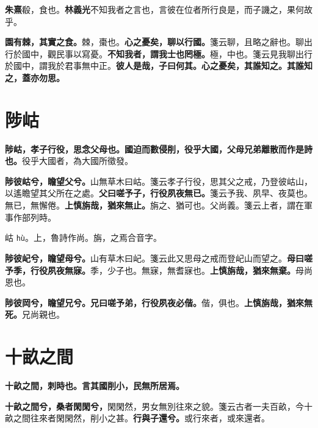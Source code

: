 \begin{quoting}\textbf{朱熹}殽，食也。\textbf{林義光}不知我者之言也，言彼在位者所行良是，而子譏之，果何故乎。\end{quoting}

\textbf{園有棘，其實之食。}{\footnotesize 棘，棗也。}\textbf{心之憂矣，聊以行國。}{\footnotesize 箋云聊，且略之辭也。聊出行於國中，觀民事以寫憂。}\textbf{不知我者，謂我士也罔極。}{\footnotesize 極，中也。箋云見我聊出行於國中，謂我於君事無中正。}\textbf{彼人是哉，子曰何其。心之憂矣，其誰知之。其誰知之，蓋亦勿思。}

\section{陟岵}


\textbf{陟岵，孝子行役，思念父母也。國迫而數侵削，役乎大國，父母兄弟離散而作是詩也。}{\footnotesize 役乎大國者，為大國所徵發。}

\textbf{陟彼岵兮，瞻望父兮。}{\footnotesize 山無草木曰岵。箋云孝子行役，思其父之戒，乃登彼岵山，以遙瞻望其父所在之處。}\textbf{父曰嗟予子，行役夙夜無已。}{\footnotesize 箋云予我、夙早、夜莫也。無已，無懈倦。}\textbf{上慎旃哉，猶來無止。}{\footnotesize 旃之、猶可也。父尚義。箋云上者，謂在軍事作部列時。}

\begin{quoting}岵 \texttt{hù}。上，魯詩作尚。旃，之焉合音字。\end{quoting}

\textbf{陟彼屺兮，瞻望母兮。}{\footnotesize 山有草木曰屺。箋云此又思母之戒而登屺山而望之。}\textbf{母曰嗟予季，行役夙夜無寐。}{\footnotesize 季，少子也。無寐，無耆寐也。}\textbf{上慎旃哉，猶來無棄。}{\footnotesize 母尚恩也。}

\textbf{陟彼岡兮，瞻望兄兮。兄曰嗟予弟，行役夙夜必偕。}{\footnotesize 偕，俱也。}\textbf{上慎旃哉，猶來無死。}{\footnotesize 兄尚親也。}

\section{十畝之間}


\textbf{十畝之間，刺時也。言其國削小，民無所居焉。}

\textbf{十畝之間兮，桑者閑閑兮，}{\footnotesize 閑閑然，男女無別往來之貌。箋云古者一夫百畝，今十畝之間往來者閑閑然，削小之甚。}\textbf{行與子還兮。}{\footnotesize 或行來者，或來還者。}

